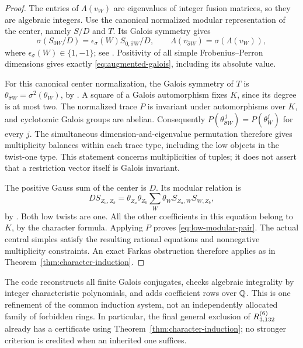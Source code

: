 \begin{proof}
The entries of $\Lambda(v_W)$ are eigenvalues of integer fusion
matrices, so they are algebraic integers. Use the canonical normalized
modular representation of the center, namely $S/D$ and $T$. Its Galois
symmetry gives
\[
 \sigma(S_{0W}/D)=\epsilon_\sigma(W)S_{0,\widehat\sigma W}/D,
 \qquad
 \Lambda(v_{\widehat\sigma W})=\sigma(\Lambda(v_W)),
\]
where $\epsilon_\sigma(W)\in\{1,-1\}$; see
\cite[equations~(2.12)--(2.13)]{BNRW}. Positivity of all simple
Frobenius--Perron dimensions gives exactly
\eqref{eq:augmented-galois}, including its absolute value.

For this canonical center normalization, the Galois symmetry of $T$
is $\theta_{\widehat\sigma W}=\sigma^2(\theta_W)$, by
\cite[Theorem~2.9(b)]{BNRW}. A square of a Galois automorphism fixes
$K$, since its degree is at most two. The normalized trace $P$ is
invariant under automorphisms over $K$, and cyclotomic Galois groups
are abelian. Consequently
$P(\theta_{\widehat\sigma W}^{\,j})=P(\theta_W^j)$ for every $j$.
The simultaneous dimension-and-eigenvalue permutation therefore gives
multiplicity balances within each trace type, including the low objects
in the twist-one type. This statement concerns multiplicities of tuples;
it does not assert that a restriction vector itself is Galois invariant.

The positive Gauss sum of the center is $D$. Its modular relation is
\[
 D S_{Z_a,Z_b}
    =\theta_{Z_a}\theta_{Z_b}\sum_W\theta_W S_{Z_a,W}S_{W,Z_b},
\]
by \cite[equation~(2.6)]{BNRW}. Both low twists are one. All the other
coefficients in this equation belong to $K$, by the character formula.
Applying $P$ proves \eqref{eq:low-modular-pair}. The actual central
simples satisfy the resulting rational equations and nonnegative
multiplicity constraints. An exact Farkas obstruction therefore applies
as in Theorem~\ref{thm:character-induction}.
\end{proof}

The code reconstructs all finite Galois conjugates, checks algebraic
integrality by integer characteristic polynomials, and adds coefficient
rows over $\mathbb Q$. This is one refinement of the common induction system,
not an independently allocated family of forbidden rings. In particular,
the final general exclusion of $R^{(6)}_{3,132}$ already has a certificate
using Theorem~\ref{thm:character-induction}; no stronger criterion is
credited when an inherited one suffices.

